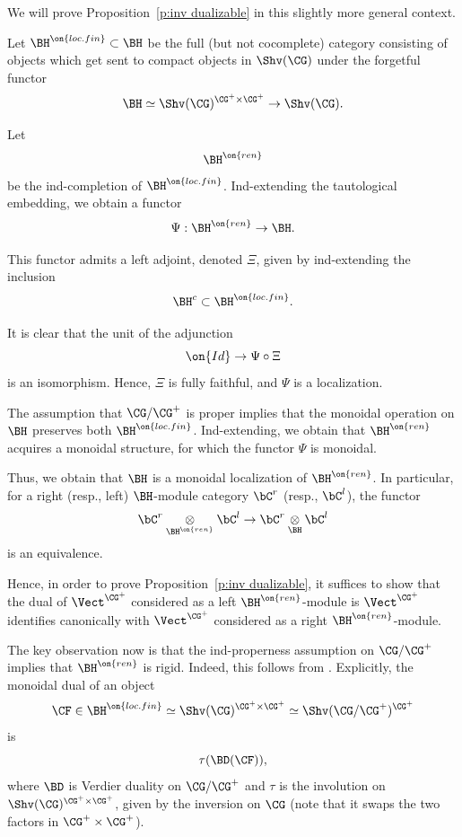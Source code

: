 \documentclass[9pt]{amsart}
\theoremstyle{definition}
\theoremstyle{remark}
\newcommand{\propref}[1]{Proposition~\ref{#1}}
\numberwithin{equation}{section}
\begin{document}
\medskip

We will prove \propref{p:inv dualizable} in this slightly more general context. 

\sssec{}

Let $\BH^{\on{loc.fin}}\subset \BH$ be the full (but not cocomplete) category consisting of objects which get
sent to compact objects in $\Shv(\CG)$ under the forgetful functor
$$\BH\simeq \Shv(\CG)^{\CG^+\times \CG^+}\to \Shv(\CG).$$

Let
$$\BH^{\on{ren}}$$ be the ind-completion of $\BH^{\on{loc.fin}}$. Ind-extending the tautological embedding,
we obtain a functor
$$\Psi:\BH^{\on{ren}}\to \BH.$$

This functor admits a left adjoint, denoted $\Xi$, given by ind-extending the inclusion
$$\BH^c\subset \BH^{\on{loc.fin}}.$$

It is clear that the unit of the adjunction
$$\on{Id}\to \Psi\circ \Xi$$
is an isomorphism. Hence, $\Xi$ is fully faithful, and $\Psi$ is a localization.

\sssec{}

The assumption that $\CG/\CG^+$ is proper implies that the monoidal operation on $\BH$ preserves both
$\BH^{\on{loc.fin}}$. Ind-extending, we obtain that $\BH^{\on{ren}}$ acquires a monoidal structure, for which
the functor $\Psi$ is monoidal.

\medskip

Thus, we obtain that $\BH$ is a monoidal localization of $\BH^{\on{ren}}$. In particular, for a right (resp., left)
$\BH$-module category $\bC^r$ (resp., $\bC^l$), the functor
$$\bC^r\underset{\BH^{\on{ren}}}\otimes \bC^l\to \bC^r\underset{\BH}\otimes \bC^l$$
is an equivalence. 

\medskip

Hence, in order to prove \propref{p:inv dualizable}, it suffices to show that the dual of $\Vect^{\CG^+}$ 
considered as a left $\BH^{\on{ren}}$-module is $\Vect^{\CG^+}$ identifies canonically with $\Vect^{\CG^+}$ 
considered as a right $\BH^{\on{ren}}$-module.

\sssec{}

The key observation now is that the ind-properness assumption on $\CG/\CG^+$ implies that $\BH^{\on{ren}}$
is rigid. Indeed, this follows from \cite[Chapter 1, Lemma 9.1.5]{GR1}. Explicitly, the monoidal dual of an object
$$\CF\in \BH^{\on{loc.fin}}\simeq \Shv(\CG)^{\CG^+\times \CG^+}\simeq \Shv(\CG/\CG^+)^{\CG^+}$$
is 
$$\tau(\BD(\CF)),$$
where $\BD$ is Verdier duality on $\CG/\CG^+$ and $\tau$ is the involution on $\Shv(\CG)^{\CG^+\times \CG^+}$,
given by the inversion on $\CG$ (note that it swaps the two factors in $\CG^+\times \CG^+$). 
\end{document}
